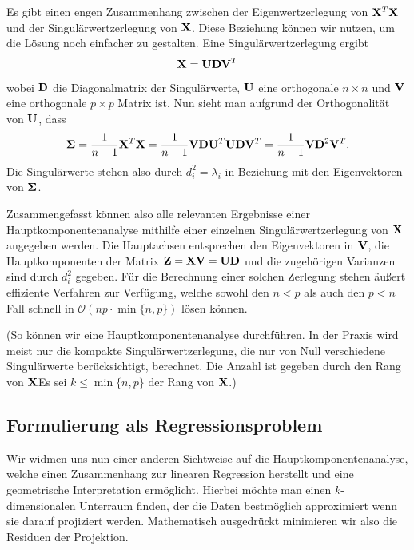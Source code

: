 Es gibt einen engen Zusammenhang zwischen der Eigenwertzerlegung von $\mathbf{X}^T \mathbf{X}$ und der Singulärwertzerlegung von $\mathbf{X}$. Diese Beziehung können wir nutzen, um die Lösung noch einfacher zu gestalten. Eine Singulärwertzerlegung ergibt
$$\mathbf{X} = \mathbf{U}\mathbf{D}\mathbf{V}^T$$
wobei $\mathbf{D}$ die Diagonalmatrix der Singulärwerte, $\mathbf{U}$ eine orthogonale $n \times n$ und $\mathbf{V}$ eine orthogonale $p \times p$ Matrix ist. Nun sieht man aufgrund der Orthogonalität von $\mathbf{U}$, dass
$$\mathbf{\Sigma} = \frac{1}{n-1}\mathbf{X}^T \mathbf{X} = \frac{1}{n-1}\mathbf{V}\mathbf{D}\mathbf{U}^T \mathbf{U}\mathbf{D}\mathbf{V}^T = \frac{1}{n-1}\mathbf{V} \mathbf{D}^2 \mathbf{V}^T.$$
Die Singulärwerte stehen also durch $d_i^2 = \lambda_i$ in Beziehung mit den Eigenvektoren von $\mathbf{\Sigma}$. 

Zusammengefasst können also alle relevanten Ergebnisse einer Hauptkomponentenanalyse mithilfe einer einzelnen Singulärwertzerlegung von $\mathbf{X}$ angegeben werden. Die Hauptachsen entsprechen den Eigenvektoren in $\mathbf{V}$, die Hauptkomponenten der Matrix $\mathbf{Z} = \mathbf{X} \mathbf{V} = \mathbf{U} \mathbf{D}$ und die zugehörigen Varianzen sind durch $d_i^2$ gegeben. Für die Berechnung einer solchen Zerlegung stehen äußert effiziente Verfahren zur Verfügung, welche sowohl den $n<p$ als auch den $p<n$ Fall schnell in $\mathcal{O}(np \cdot \min\{n,p\})$ lösen können. 

(So können wir eine Hauptkomponentenanalyse  durchführen. In der Praxis wird meist nur die kompakte Singulärwertzerlegung, die nur von Null verschiedene Singulärwerte berücksichtigt, berechnet. Die Anzahl ist gegeben durch den Rang von $\mathbf{X}$Es sei $k \leq \min\{n,p\}$ der Rang von $\mathbf{X}$.)

\subsection{Formulierung als Regressionsproblem}

Wir widmen uns nun einer anderen Sichtweise auf die Hauptkomponentenanalyse, welche einen Zusammenhang zur linearen Regression herstellt und eine geometrische Interpretation ermöglicht. Hierbei möchte man einen $k$-dimensionalen Unterraum finden, der die Daten bestmöglich approximiert wenn sie darauf projiziert werden. Mathematisch ausgedrückt minimieren wir also die Residuen der Projektion.

